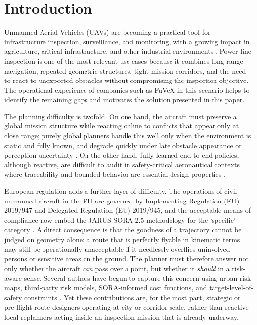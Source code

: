 \documentclass[drones,article,submit,moreauthors]{Definitions/mdpi}
\begin{document}
\section{Introduction}

Unmanned Aerial Vehicles (UAVs) are becoming a practical tool for infrastructure inspection, surveillance, and monitoring, with a growing impact in agriculture, critical infrastructure, and other industrial environments \cite{imran2025environmental,marut2024surveillance}. Power-line inspection is one of the most relevant use cases because it combines long-range navigation, repeated geometric structures, tight mission corridors, and the need to react to unexpected obstacles without compromising the inspection objective. The operational experience of companies such as FuVeX in this scenario helps to identify the remaining gaps and motivates the solution presented in this paper. 

The planning difficulty is twofold. On one hand, the aircraft must preserve a global mission structure while reacting online to conflicts that appear only at close range; purely global planners handle this well only when the environment is static and fully known, and degrade quickly under late obstacle appearance or perception uncertainty \cite{debnath2024review,meng2025advances}. On the other hand, fully learned end-to-end policies, although reactive, are difficult to audit in safety-critical aeronautical contexts where traceability and bounded behavior are essential design properties \cite{EASA_AI_Roadmap_2.0}.

European regulation adds a further layer of difficulty. The operations of civil unmanned aircraft in the EU are governed by Implementing Regulation (EU) 2019/947 and Delegated Regulation (EU) 2019/945, and the acceptable means of compliance now embed the JARUS SORA 2.5 methodology for the `specific' category \cite{EU2019_947,EU2019_945,JARUS_SORA_2_5_2024,EASA_AMC_GM_SORA25_2025}. A direct consequence is that the goodness of a trajectory cannot be judged on geometry alone: a route that is perfectly flyable in kinematic terms may still be operationally unacceptable if it needlessly overflies uninvolved persons or sensitive areas on the ground. The planner must therefore answer not only whether the aircraft \emph{can} pass over a point, but whether it \emph{should} in a risk-aware sense. Several authors have begun to capture this concern using urban risk maps, third-party risk models, SORA-informed cost functions, and target-level-of-safety constraints \cite{primatesta2019riskaware,primatesta2020groundrisk,pang2022integrated,tang2023thirdparty,zhang2023groundrisk,heinze2023sora,brassel2025riskaware}. Yet these contributions are, for the most part, strategic or pre-flight route designers operating at city or corridor scale, rather than reactive local replanners acting inside an inspection mission that is already underway.
\end{document}
